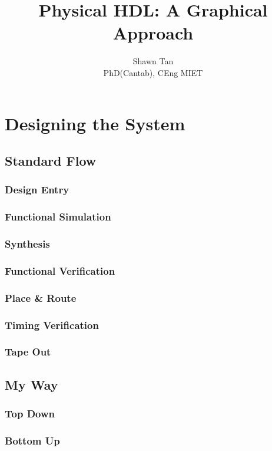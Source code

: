 \documentclass[a4paper,11pt]{book}
\title{Physical HDL: A Graphical Approach}
\author{Shawn Tan\\ \tiny{PhD(Cantab), CEng MIET}}
\begin{document}
\frontmatter
\maketitle
\tableofcontents



\mainmatter
\onehalfspace

\part{Designing the System}
\label{PART:FASM}

\chapter{Standard Flow}
\section{Design Entry}
\section{Functional Simulation}
\section{Synthesis}
\section{Functional Verification}
\section{Place \& Route}
\section{Timing Verification}
\section{Tape Out}


\chapter{My Way}
\section{Top Down}
\section{Bottom Up}
\end{document}
